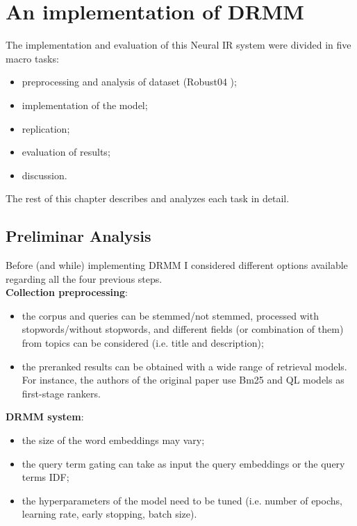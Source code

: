 \newpage
\chapter{An implementation of DRMM}

The implementation and evaluation of this Neural IR system were divided in five macro tasks:

\begin{itemize}
\item preprocessing and analysis of dataset (Robust04 \cite{rob04});
\item implementation of the model;
\item replication;
\item evaluation of results;
\item discussion.
\end{itemize}

The rest of this chapter describes and analyzes each task in detail.

\section{Preliminar Analysis}

Before (and while) implementing DRMM I considered different options available regarding all the four previous steps.\\

\textbf{Collection preprocessing}:

\begin{itemize}
 \item the corpus and queries can be stemmed/not stemmed, processed with
stopwords/without stopwords, and different fields (or combination of them) from topics can be considered (i.e. title and description);
 \item the preranked results can be obtained with a wide range of retrieval models. For instance, the authors of the original paper use Bm25 and QL models as first-stage rankers.
\end{itemize}

\textbf{DRMM system}:

\begin{itemize}
 \item the size of the word embeddings may vary;
 \item the query term gating can take as input the query embeddings or the query terms IDF;
 \item the hyperparameters of the model need to be tuned (i.e. number of epochs, learning rate, early stopping, batch size).
\end{itemize}

